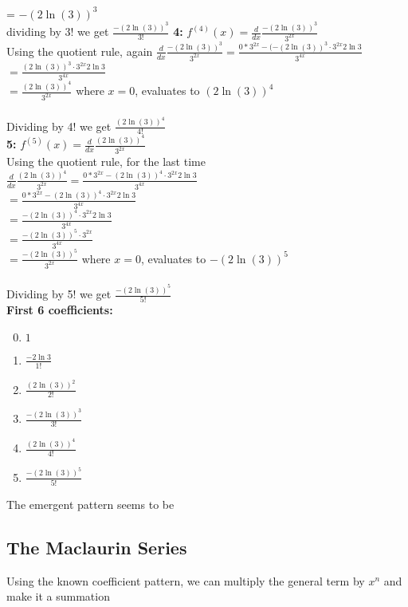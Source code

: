 \documentclass{article}
\begin{document}
\begin{multicols*}{2}
    \\[0.1in] = ${-(2\ln(3))^3}$
    \\[0in] dividing by $3!$ we get $\boxed{\frac{-(2\ln(3))^3} {3!}}$
    \vfill\null
    \columnbreak
    \textbf{4: }$f^{(4)}(x)= \frac{d}{dx} \frac{-(2\ln(3))^3}{3^{2x}}$
    \\[0.1in]Using the quotient rule, again $\frac{d}{dx} \frac{-(2\ln(3))^3}{3^{2x}} = \frac{0*3^{2x}-(-(2\ln(3))^3\cdot3^{2x}2\ln3}{3^{4x}}$ 
    \\[0.1in]$= \frac{(2\ln(3))^3\cdot3^{2x}2\ln3}{3^{4x}}$ 
    \\[0.1in]$= \frac{(2\ln(3))^4}{3^{2x}}$ where $x=0$, evaluates to ${(2\ln(3))^4}$
    \\\\[0in]Dividing by 4! we get $\boxed{\frac{(2\ln(3))^4}{4!}}$
    \\[0.1in]\textbf{5: }$f^{(5)}(x)= \frac{d}{dx} \frac{(2\ln(3))^4}{3^{2x}}$
    \\[0.1in]Using the quotient rule, for the last time \\[0.1in]$\frac{d}{dx}\frac{(2\ln(3))^4}{3^{2x}} = \frac{0*3^{2x}-(2\ln(3))^4\cdot3^{2x}2\ln3}{3^{4x}}$ 
    \\[0.1in]$ = \frac{0*3^{2x}-(2\ln(3))^4\cdot3^{2x}2\ln3}{3^{4x}}$ 
    \\[0.1in]$ = \frac{-(2\ln(3))^4\cdot3^{2x}2\ln3}{3^{4x}}$ 
    \\[0.1in]$ = \frac{-(2\ln(3))^5\cdot3^{2x}}{3^{4x}}$ 
    \\[0.1in]$ = \frac{-(2\ln(3))^5}{3^{2x}}$ where $x=0$, evaluates to ${-(2\ln(3))^5}$
    \\\\[0in]Dividing by 5! we get $\boxed{\frac{-(2\ln(3))^5}{5!}}$
    \\[0.05in]
    \vfill\null
    \pagebreak
    \textbf{First 6 coefficients:}
    \begin{enumerate}
        \setcounter{enumi}{-1}
        \item $1$
        \item $\frac{-2\ln3}{1!}$
        \item $\frac{(2\ln(3))^2}{2!}$
        \item $\frac{-(2\ln(3))^3}{3!}$
        \item $\frac{(2\ln(3))^4}{4!}$
        \item $\frac{-(2\ln(3))^5}{5!}$
    \end{enumerate}
    The emergent pattern seems to be 
    \subsection*{\textbf{The Maclaurin Series}}
    Using the known coefficient pattern, we can multiply the general term by $x^n$ and make it a summation 

\end{multicols*}
\end{document}
